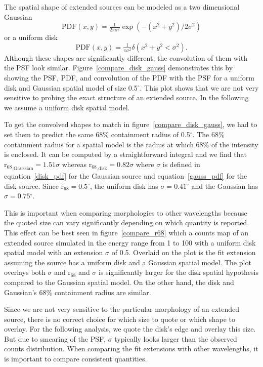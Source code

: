 \documentclass[12pt,preprint]{aastex}
\newcommand{\gev}{\text{GeV}\xspace}
\newcommand{\rsixeight}{{\ensuremath{\text{r}_{68}}}\xspace}
\renewcommand{\deg}{\ensuremath{^\circ}\xspace}
\begin{document}
The spatial shape of extended sources can be modeled
as a two dimensional Gaussian
\begin{equation}\label{gauss_pdf}
  \text{PDF}(x,y)=\tfrac{1}{2\pi\sigma^2}\exp\left(-(x^2+y^2)/2\sigma^2\right)
\end{equation}
or a uniform disk
\begin{equation}\label{disk_pdf}
  \text{PDF}(x,y)=\tfrac{1}{\pi\sigma^2}\delta\left(x^2+y^2<\sigma^2\right).
\end{equation}
Although these shapes are significantly different, the convolution of them
with the PSF look similar.  Figure~\ref{compare_disk_gauss} demonstrates
this by showing the PSF, PDF, and convolution of the PDF with the PSF
for a uniform disk and Gaussian spatial model of size 0.5\deg.  This plot
shows that we are not very sensitive to probing the exact structure of an
extended source.  In the following we assume a uniform disk spatial model.

To get the convolved shapes to match in figure~\ref{compare_disk_gauss},
we had to set them to predict the same 68\% containment
radius of 0.5\deg.  The 68\% containment radius for a
spatial model is the radius at which 68\% of the intensity is
enclosed.  It can be computed by a straightforward integral
and we find that $\rsixeight_\text{,Gaussian}=1.51\sigma$
whereas $\rsixeight_\text{,disk}=0.82\sigma$ where $\sigma$
is defined in equation~\ref{disk_pdf} for the Gaussian source and
equation~\ref{gauss_pdf} for the disk source.  Since $\rsixeight=0.5\deg$,
the uniform disk has $\sigma=0.41\deg$ and the Gaussian has
$\sigma=0.75\deg$.

This is important when comparing morphologies to other wavelengths
because the quoted size can vary significantly depending on which quantity
is reported.  This effect can be best seen in figure~\ref{compare_r68}
which a counts map of an extended source simulated in the energy
range from 1 \gev to 100 \gev with a uniform disk spatial model with
an extension $\sigma$ of 0.5. Overlaid on the plot is the fit extension
assuming the source has a uniform disk and a Gaussian spatial model. The
plot overlays both $\sigma$ and $\rsixeight$ and $\sigma$ is significantly
larger for the disk spatial hypothesis compared to the Gaussian spatial
model. On the other hand, the disk and Gaussian's 68\% containment radius
are similar.

Since we are not very sensitive to the particular morphology of an
extended source, there is no correct choice for which size to quote
or which shape to overlay. For the following analysis, we quote the
disk's edge and overlay this size.  But due to smearing of the PSF,
$\sigma$ typically looks larger than the observed counts distribution.
When comparing the fit extensions with other wavelengths, it is important
to compare consistent quantities.
\end{document}
